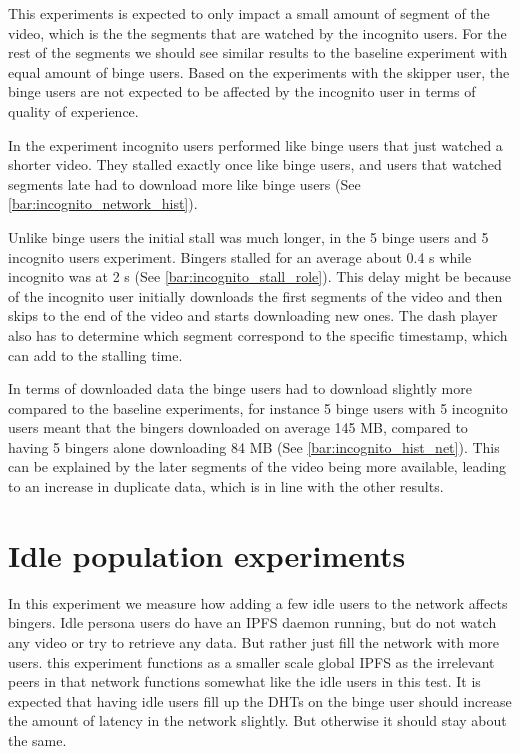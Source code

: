 This experiments is expected to only impact a small amount of segment of the video, which is the the segments that are watched by the incognito users.
For the rest of the segments we should see similar results to the baseline experiment with equal amount of binge users. Based on the experiments with the skipper user, the binge users are not expected to be affected by the incognito user in terms of quality of experience.

In the experiment incognito users performed like binge users that just watched a shorter video. They stalled exactly once like binge users, and users that watched segments late had to download more like binge users (See \autoref{bar:incognito_network_hist}). 



Unlike binge users the initial stall was much longer, in the 5 binge users and 5 incognito users experiment. Bingers stalled for an average about 0.4 \acs{s} while incognito was at 2 \acs{s} (See \autoref{bar:incognito_stall_role}). This delay might be because of the incognito user initially downloads the first segments of the video and then skips to the end of the video and starts downloading new ones. The dash player also has to determine which segment correspond to the specific timestamp, which can add to the stalling time.



In terms of downloaded data the binge users had to download slightly more compared to the baseline experiments, for instance 5 binge users with 5 incognito users meant that the bingers downloaded on average 145 \ac{MB}, compared to having 5 bingers alone downloading 84 \ac{MB} (See \autoref{bar:incognito_hist_net}). This can be explained by the later segments of the video being more available, leading to an increase in duplicate data, which is in line with the other results.



\section{Idle population experiments} %
In this experiment we measure how adding a few idle users to the network affects bingers.
Idle persona users do have an \ac{IPFS} daemon running, but do not watch any video or try to retrieve any data. But rather just fill the network with more users.
this experiment functions as a smaller scale global \ac{IPFS} as the irrelevant peers in that network functions somewhat like the idle users in this test. It is expected that having idle users fill up the \ac{DHT}s on the binge user should increase the amount of latency in the network slightly. But otherwise it should stay about the same.

